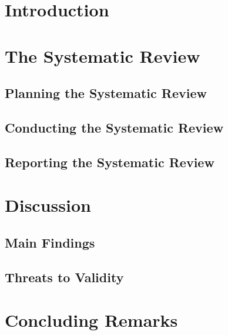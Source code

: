 \documentclass{llncs}
\begin{document}
\section{Introduction}\label{sec:Introduction}
\linespread{0.87}


\section{The Systematic Review}\label{method}


	\subsection{Planning the Systematic Review}\label{planning}
	
	\subsection{Conducting the Systematic Review}\label{conducting}
	
	\subsection{Reporting the Systematic Review}\label{reporting}
	

\section{Discussion}\label{sec:discussion_and_threats}
	

\subsection{Main Findings}\label{sec:principle_findings}
	

\subsection{Threats to Validity}\label{threats}
		


\section{Concluding Remarks}\label{conclusion}
		





\end{document}
